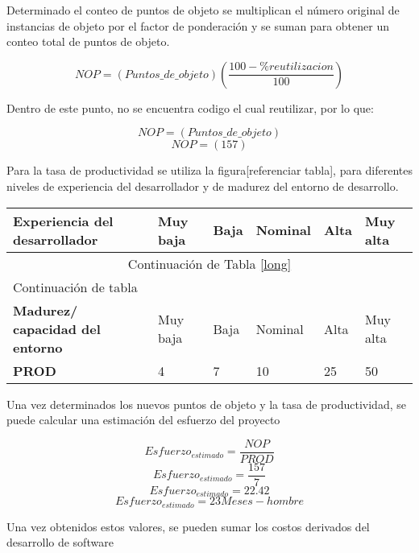 Determinado el conteo de puntos de objeto se multiplican el número original de instancias de objeto por el factor de ponderación y se suman para obtener un conteo total de puntos de objeto.

\[ NOP = (Puntos\_de\_objeto)(\frac{100-\%reutilizacion}{100})\]

Dentro de este punto, no se encuentra codigo el cual reutilizar, por lo que:

\[ NOP = (Puntos\_de\_objeto)\]
\[ NOP = (157)\]

Para la tasa de productividad se utiliza la figura[referenciar tabla], para diferentes niveles de experiencia del desarrollador y de madurez del entorno de desarrollo.



\begin{longtable}{  l || l | l | l | l | l  }	
	
	\hline
	
	\textbf{Experiencia del desarrollador } & Muy baja & Baja & Nominal & Alta & Muy alta  \\
	\hline
	
	\endfirsthead
	
	\multicolumn{6}{c}{Continuación de Tabla \ref{long}}\\
	\hline
	Continuación de tabla\\
	\hline
	\endhead
	
	\hline
	\endfoot
	
	\textbf{Madurez/ capacidad del entorno } & Muy baja & Baja & Nominal & Alta & Muy alta  \\
	\hline
	\textbf{PROD } & 4 & 7 & 10 & 25 & 50 \\
\end{longtable}

Una vez determinados los nuevos puntos de objeto y la tasa de productividad, se puede calcular una estimación del esfuerzo del proyecto 

\[ Esfuerzo_{estimado} = \frac{NOP}{PROD}\]
\[ Esfuerzo_{estimado} = \frac{157}{7}\]
\[ Esfuerzo_{estimado} = 22.42\]
\[ Esfuerzo_{estimado} = 23 Meses-hombre\]

Una vez obtenidos estos valores, se pueden sumar los costos derivados del desarrollo de software 



